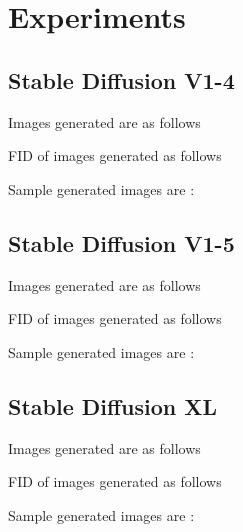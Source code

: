 \section{Experiments}

\subsection{Stable Diffusion V1-4}
Images generated are as follows

FID of images generated as follows

Sample generated images are : 


\subsection{Stable Diffusion V1-5}
Images generated are as follows

FID of images generated as follows

Sample generated images are : 


\subsection{Stable Diffusion XL}

Images generated are as follows

FID of images generated as follows

Sample generated images are : 



